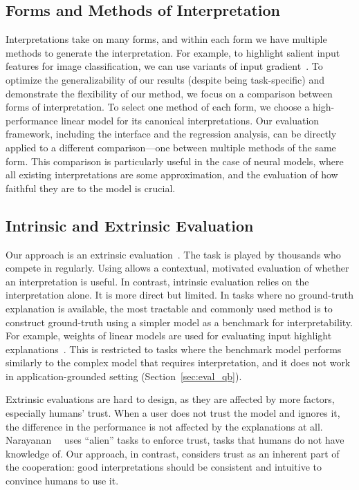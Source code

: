 \subsection{Forms and Methods of Interpretation}

Interpretations take on many forms, and within each form we have multiple
methods to generate the interpretation. For example, to highlight
salient input features for image classification, we can use variants
of input gradient~\cite{baehrens2010explain, simonyan2013deep}.
To optimize the generalizability of our results (despite being
task-specific) and demonstrate the flexibility of our method, we
focus on a comparison between forms of interpretation. To
select one method of each form, we choose a
high-performance linear model for its canonical interpretations.  Our
evaluation framework, including the interface and the regression
analysis, can be directly applied to a different comparison---one
between multiple methods of the same form.  This comparison is
particularly useful in the case of neural models, where all existing
interpretations are some approximation, and the evaluation of
how faithful they are to the model is crucial.


\subsection{Intrinsic and Extrinsic Evaluation}

Our approach is an extrinsic evaluation~\cite{narayanan2018humans}. The
task is played by thousands who compete in regularly.  Using
\qb{} allows a contextual, motivated evaluation of whether an
interpretation is useful. In contrast, intrinsic evaluation relies on
the interpretation alone. It is more direct but limited. In tasks
where no ground-truth explanation is available, the most tractable and
commonly used method is to construct ground-truth using a simpler
model as a benchmark for interpretability. For example, weights of linear models are
used for evaluating input highlight
explanations~\cite{li2016understanding,murdoch2018cd}.
This is restricted to tasks where the benchmark model performs
similarly to the complex model that requires interpretation, and it
does not work in application-grounded setting
(Section~\ref{sec:eval_qb}).

Extrinsic evaluations are hard to design, as they are affected by more
factors, especially humans' trust. When a user does not trust the
model and ignores it, the difference in the performance is not
affected by the explanations at all. Narayanan~\etal{}~\cite{narayanan2018humans} uses
``alien'' tasks to enforce trust, tasks that humans do not have
knowledge of. Our approach, in contrast, considers trust as an
inherent part of the cooperation: good interpretations should be
consistent and intuitive to convince humans to use it.

